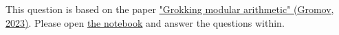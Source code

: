 
This question is based on the paper \href{https://arxiv.org/abs/2301.02679}{"Grokking modular arithmetic" (Gromov, 2023)}. Please open \href{\colabgiturl/\questionname/q_grokking_modular_arithmetics.ipynb}{the notebook} and answer the questions within.